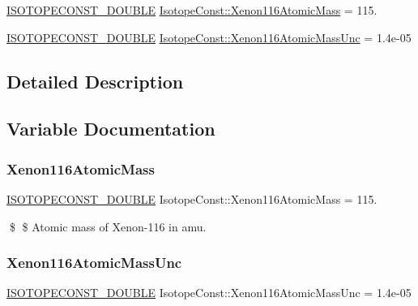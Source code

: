 \begin{DoxyCompactItemize}
\item 
\mbox{\hyperlink{group___isotope_const-_macros_ga8f45a7272ce02c0b4c65c44636ed719a}{I\+S\+O\+T\+O\+P\+E\+C\+O\+N\+S\+T\+\_\+\+D\+O\+U\+B\+LE}} \mbox{\hyperlink{group___isotope_const-_xenon-_xe116_gaeddddf202445beee4a6be444049170e6}{Isotope\+Const\+::\+Xenon116\+Atomic\+Mass}} = 115.
\item 
\mbox{\hyperlink{group___isotope_const-_macros_ga8f45a7272ce02c0b4c65c44636ed719a}{I\+S\+O\+T\+O\+P\+E\+C\+O\+N\+S\+T\+\_\+\+D\+O\+U\+B\+LE}} \mbox{\hyperlink{group___isotope_const-_xenon-_xe116_ga3aab814a6116afa9e239927cdc1a4316}{Isotope\+Const\+::\+Xenon116\+Atomic\+Mass\+Unc}} = 1.\+4e-\/05
\end{DoxyCompactItemize}


\subsection{Detailed Description}


\subsection{Variable Documentation}
\mbox{\label{group___isotope_const-_xenon-_xe116_gaeddddf202445beee4a6be444049170e6}} 
\subsubsection{\texorpdfstring{Xenon116\+Atomic\+Mass}{Xenon116AtomicMass}}
{\footnotesize\ttfamily \mbox{\hyperlink{group___isotope_const-_macros_ga8f45a7272ce02c0b4c65c44636ed719a}{I\+S\+O\+T\+O\+P\+E\+C\+O\+N\+S\+T\+\_\+\+D\+O\+U\+B\+LE}} Isotope\+Const\+::\+Xenon116\+Atomic\+Mass = 115.}

\$ \$ Atomic mass of Xenon-\/116 in amu. \mbox{\label{group___isotope_const-_xenon-_xe116_ga3aab814a6116afa9e239927cdc1a4316}} 
\subsubsection{\texorpdfstring{Xenon116\+Atomic\+Mass\+Unc}{Xenon116AtomicMassUnc}}
{\footnotesize\ttfamily \mbox{\hyperlink{group___isotope_const-_macros_ga8f45a7272ce02c0b4c65c44636ed719a}{I\+S\+O\+T\+O\+P\+E\+C\+O\+N\+S\+T\+\_\+\+D\+O\+U\+B\+LE}} Isotope\+Const\+::\+Xenon116\+Atomic\+Mass\+Unc = 1.\+4e-\/05}

